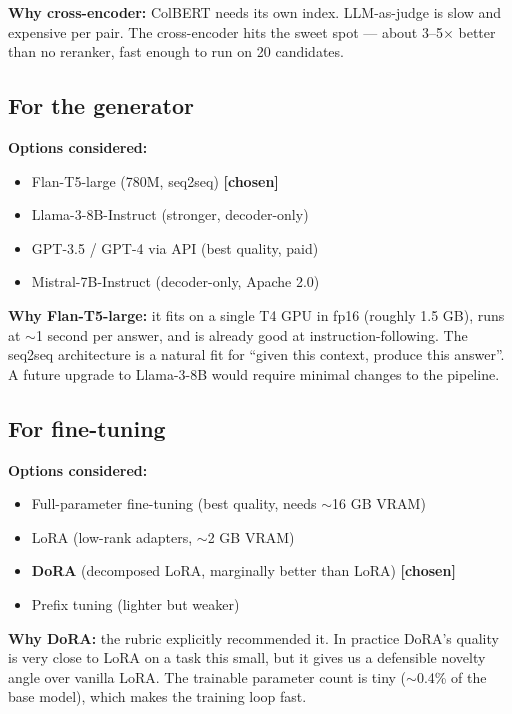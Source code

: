 \documentclass[11pt,a4paper]{article}
\begin{document}
\textbf{Why cross-encoder:} ColBERT needs its own index. LLM-as-judge is slow and expensive per pair. The cross-encoder hits the sweet spot --- about 3--5$\times$ better than no reranker, fast enough to run on 20 candidates.

\subsection{For the generator}

\begin{alt}
\textbf{Options considered:}
\begin{itemize}[leftmargin=*, itemsep=0pt, topsep=0pt]
\item Flan-T5-large (780M, seq2seq) \textbf{[chosen]}
\item Llama-3-8B-Instruct (stronger, decoder-only)
\item GPT-3.5 / GPT-4 via API (best quality, paid)
\item Mistral-7B-Instruct (decoder-only, Apache 2.0)
\end{itemize}
\end{alt}

\textbf{Why Flan-T5-large:} it fits on a single T4 GPU in fp16 (roughly 1.5 GB), runs at $\sim$1 second per answer, and is already good at instruction-following. The seq2seq architecture is a natural fit for ``given this context, produce this answer''. A future upgrade to Llama-3-8B would require minimal changes to the pipeline.

\subsection{For fine-tuning}

\begin{alt}
\textbf{Options considered:}
\begin{itemize}[leftmargin=*, itemsep=0pt, topsep=0pt]
\item Full-parameter fine-tuning (best quality, needs $\sim$16 GB VRAM)
\item LoRA (low-rank adapters, $\sim$2 GB VRAM)
\item \textbf{DoRA} (decomposed LoRA, marginally better than LoRA) \textbf{[chosen]}
\item Prefix tuning (lighter but weaker)
\end{itemize}
\end{alt}

\textbf{Why DoRA:} the rubric explicitly recommended it. In practice DoRA's quality is very close to LoRA on a task this small, but it gives us a defensible novelty angle over vanilla LoRA. The trainable parameter count is tiny ($\sim$0.4\% of the base model), which makes the training loop fast.
\end{document}
